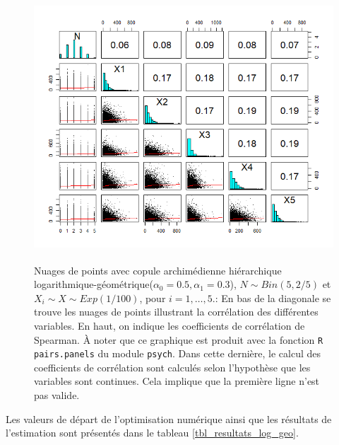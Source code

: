 \documentclass{article}
\begin{document}
	\begin{figure}[H]
		\centering
		\includegraphics[height=10cm]{Graph/scatterplot_log_geo.png}
		\caption[Nuages de points du scénario \ref{scenario_log_geo}]
		{Nuages de points avec copule archimédienne hiérarchique logarithmique-géométrique($\alpha_0=0.5, \alpha_1 = 0.3$), $N \sim Bin(5, 2/5)$ et $X_i \sim X \sim Exp(1/100)$, pour $i=1,\dots, 5$.:
			En bas de la diagonale se trouve les nuages de points illustrant la corrélation des différentes variables. En haut, on indique les coefficients de corrélation de Spearman. À noter que ce graphique est produit avec la fonction \texttt{R} \texttt{pairs.panels} du module \texttt{psych}. Dans cette dernière, le calcul des coefficients de corrélation sont calculés selon l'hypothèse que les variables sont continues. Cela implique que la première ligne n'est pas valide.}
		\label{graph_scatterplot_log_geo}
	\end{figure}
	
	Les valeurs de départ de l'optimisation numérique ainsi que les résultats de l'estimation sont présentés dans le tableau \ref{tbl_resultats_log_geo}.
	
\end{document}
